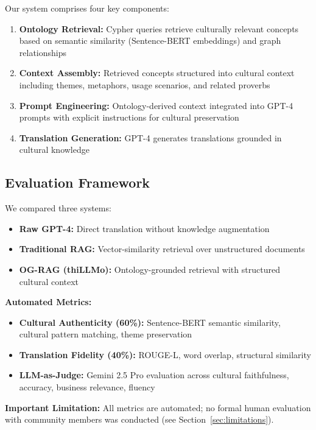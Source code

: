 \documentclass[sigconf,nonacm]{acmart}
\begin{document}
Our system comprises four key components:

\begin{enumerate}
    \item \textbf{Ontology Retrieval:} Cypher queries retrieve culturally relevant concepts based on semantic similarity (Sentence-BERT embeddings) and graph relationships
    \item \textbf{Context Assembly:} Retrieved concepts structured into cultural context including themes, metaphors, usage scenarios, and related proverbs
    \item \textbf{Prompt Engineering:} Ontology-derived context integrated into GPT-4 prompts with explicit instructions for cultural preservation
    \item \textbf{Translation Generation:} GPT-4 generates translations grounded in cultural knowledge
\end{enumerate}

\subsection{Evaluation Framework}

We compared three systems:
\begin{itemize}
    \item \textbf{Raw GPT-4:} Direct translation without knowledge augmentation
    \item \textbf{Traditional RAG:} Vector-similarity retrieval over unstructured documents
    \item \textbf{OG-RAG (thiLLMo):} Ontology-grounded retrieval with structured cultural context
\end{itemize}

\textbf{Automated Metrics:}
\begin{itemize}
    \item \textbf{Cultural Authenticity (60\%):} Sentence-BERT semantic similarity, cultural pattern matching, theme preservation
    \item \textbf{Translation Fidelity (40\%):} ROUGE-L, word overlap, structural similarity
    \item \textbf{LLM-as-Judge:} Gemini 2.5 Pro evaluation across cultural faithfulness, accuracy, business relevance, fluency
\end{itemize}

\textbf{Important Limitation:} All metrics are automated; no formal human evaluation with community members was conducted (see Section~\ref{sec:limitations}).
\end{document}
